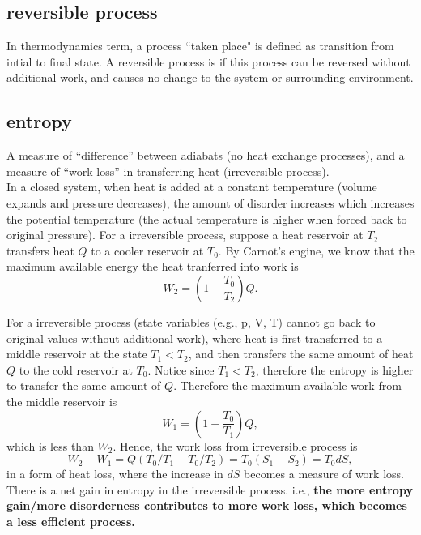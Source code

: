 \subsection{reversible process}
In thermodynamics term, a process ``taken place" is defined as transition from intial to final
state. A reversible process is if this process can be reversed without additional work, and causes
no change to the system or surrounding environment. 

\subsection{entropy}
A measure of ``difference'' between adiabats (no heat exchange processes), and a measure of ``work
loss'' in transferring heat (irreversible process). \\

In a closed system, when heat is added at a constant temperature (volume expands and pressure
decreases), the amount of disorder increases which increases the potential temperature (the actual
temperature is higher when forced back to original pressure). For a irreversible process, suppose a
heat reservoir at $T_2$ transfers heat $Q$ to a cooler reservoir at $T_0$. By Carnot's engine, we
know that the maximum available energy the heat tranferred into work is
\begin{equation}
    W_2 = (1-\frac{T_0}{T_2})Q.
\end{equation}

For a irreversible process (state variables (e.g., p, V, T) cannot go back to original values
without additional work), where heat is first transferred to a middle reservoir at the state $T_1 <
T_2$, and then transfers the same amount of heat $Q$ to the cold reservoir at $T_0$.
Notice since $T_1 < T_2$, therefore the entropy is higher to transfer the same amount of $Q$.
Therefore the maximum available work from the middle reservoir is
\begin{equation}
    W_1 = (1-\frac{T_0}{T_1})Q,
\end{equation}
which is less than $W_2$. Hence, the work loss from irreversible process is 
\begin{equation}
    W_2-W_1 = Q(T_0/T_1 - T_0/T_2) = T_0(S_1 - S_2) = T_0 dS,
\end{equation} 
in a form of heat loss, where the increase in $dS$ becomes a measure of work loss. 
There is a net gain in entropy in the irreversible process.
i.e., {\bf the more entropy gain/more disorderness contributes to more work loss, which becomes a
less efficient process.}

